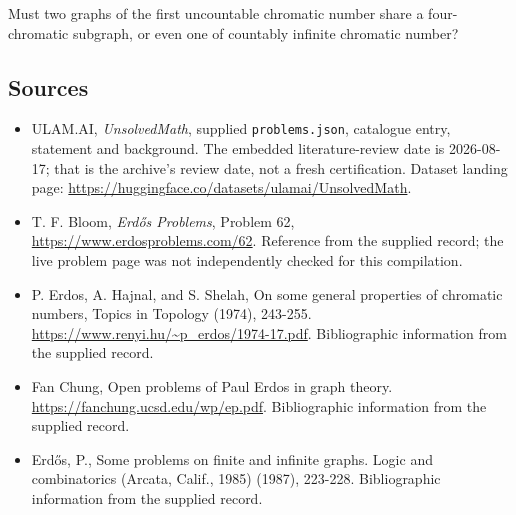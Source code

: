 \documentclass[11pt,a4paper]{article}
\begin{document}
Must two graphs of the first uncountable chromatic number share a four-chromatic subgraph, or even one of countably infinite chromatic number?

\subsection{Sources}

{\small

\begin{itemize}

\item[\hypertarget{source:statement:1}{S1}] ULAM.AI, \emph{UnsolvedMath}, supplied \texttt{problems.json}, catalogue entry, statement and background. The embedded literature-review date is 2026-08-17; that is the archive’s review date, not a fresh certification. Dataset landing page: \url{https://huggingface.co/datasets/ulamai/UnsolvedMath}.

\item[\hypertarget{source:statement:2}{S2}] T. F. Bloom, \emph{Erdős Problems}, Problem 62, \url{https://www.erdosproblems.com/62}. Reference from the supplied record; the live problem page was not independently checked for this compilation.

\item[\hypertarget{source:statement:3}{S3}] P. Erdos, A. Hajnal, and S. Shelah, On some general properties of chromatic numbers, Topics in Topology (1974), 243-255. \url{https://www.renyi.hu/~p_erdos/1974-17.pdf}. Bibliographic information from the supplied record.

\item[\hypertarget{source:statement:4}{S4}] Fan Chung, Open problems of Paul Erdos in graph theory. \url{https://fanchung.ucsd.edu/wp/ep.pdf}. Bibliographic information from the supplied record.

\item[\hypertarget{source:statement:5}{S5}] Erd\H{o}s, P., Some problems on finite and infinite graphs. Logic and combinatorics (Arcata, Calif., 1985) (1987), 223-228. Bibliographic information from the supplied record.

\end{itemize}

}

\label{end:statement}
\end{document}
